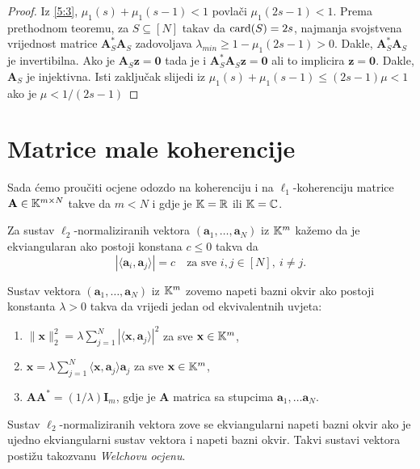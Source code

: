 \documentclass[a4paper,twoside,12pt]{memoir} %
\newcommand{\vect}[1]{\mathbf{#1}}
\renewcommand{\vec}{\vect}
\newcommand{\card}{\text{\normalfont{card}}}
\newcommand{\norm}[1]{\|{#1}\|}
\begin{document}
\begin{proof}
    Iz \eqref{5:3}, $\mu_1(s) + \mu_1(s-1) < 1$ povla\v{c}i $\mu_1(2s-1) < 1$. Prema prethodnom teoremu, za $S \subseteq [N]$ takav da $\card(S) = 2s$, najmanja svojstvena vrijednost matrice $\vec A^*_S \vec A_S$ zadovoljava $\lambda_{min} \geq 1 - \mu_1(2s-1)>0$. Dakle, $\vec A^*_S \vec A_S$ je invertibilna. Ako je $\vec A_S \vec z = \vec 0$ tada je i $\vec A^*_S \vec A_S \vec z = \vec 0$ ali to implicira $\vec z = \vec 0$. Dakle, $\vec A_S$ je injektivna. Isti zaklju\v{c}ak slijedi iz $\mu_1(s) + \mu_1(s-1) \leq (2s-1)\mu < 1$ ako je $\mu < 1/(2s-1)$
\end{proof}

\section[Matrice male koherencije][Matrice male koherencije]{Matrice male koherencije}
Sada \'cemo prou\v{c}iti ocjene odozdo na koherenciju i na $\ell_1$-koherenciju matrice $\vec A \in \K^{m \times N}$ takve da $m < N$ i gdje je $\mathbb{K} = \mathbb{R}$ ili $\mathbb{K} = \mathbb{C}$.
\begin{defn}
    Za sustav $\ell_2$-normaliziranih vektora $(\vec a_1, \dots, \vec a_N)$ iz $\mathbb{K}^m$ ka\v{z}emo da je ekviangularan ako postoji konstana $c \leq 0$ takva da
    \begin{equation*}
        |\langle \vec a_i, \vec a_j \rangle|  = c \quad \text{za sve } i,j \in [N],\ i \neq j.
    \end{equation*}
\end{defn}
\begin{defn}
    Sustav  vektora $(\vec a_1, \dots, \vec a_N)$ iz $\mathbb{K}^m$ zovemo napeti bazni okvir ako postoji konstanta $\lambda > 0$ takva da vrijedi jedan od ekvivalentnih uvjeta:
    \begin{enumerate}[label=(\alph*)]
        \item $\norm{\vec x}_2^2 = \lambda \sum_{j=1}^N |\langle \vec x, \vec a_j \rangle|^2$ za sve $\vec x \in \K^m$,
        \item $\vec{x} = \lambda \sum_{j=1}^N \langle \vec x, \vec a_j\rangle \vec a_j$  za sve $\vec x \in \K^m$,
        \item $\vec{AA}^* = (1/\lambda) \vec I_m$, gdje je $\vec A$ matrica sa stupcima $\vec a_1, \dots \vec a_N$.
    \end{enumerate}
\end{defn}
Sustav $\ell_2$-normaliziranih vektora zove se ekviangularni napeti bazni okvir ako je ujedno ekviangularni sustav vektora i napeti bazni okvir. Takvi sustavi vektora posti\v{z}u takozvanu \textit{Welchovu ocjenu}.
\end{document}
